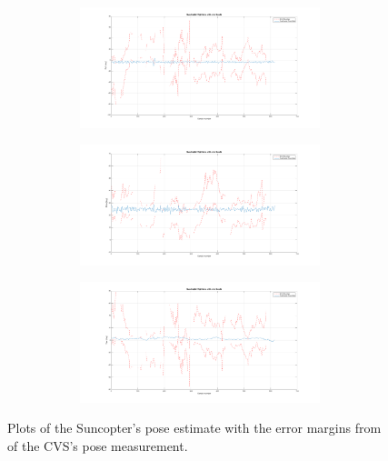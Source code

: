 \begin{figure}
\begin{subfigure}{0.48\textwidth}
\begin{subfigure}{\textwidth}
    \end{subfigure}
    \caption{}
  \end{subfigure}
  \begin{subfigure}{0.48\textwidth}
    \begin{subfigure}{\textwidth}
      \includegraphics[clip, trim = 100 0 100 0, width = \textwidth]{figures/chapter5/roll}
    \end{subfigure}
    \begin{subfigure}{\textwidth}
      \includegraphics[clip, trim = 100 0 100 0, width = \textwidth]{figures/chapter5/pitch}
    \end{subfigure}
    \begin{subfigure}{\textwidth}
      \includegraphics[clip, trim = 100 0 100 0, width = \textwidth]{figures/chapter5/yaw}
    \end{subfigure}
    \caption{}
  \end{subfigure}
\caption[Plots of the Suncopter's flight and measurement errors.]{Plots of the Suncopter's pose estimate with the error margins from of the CVS's pose measurement. }
\label{fig:chap5-results}
\end{figure}

